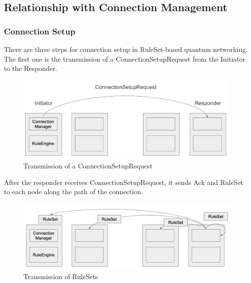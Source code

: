 \subsection{Relationship with Connection Management}
\subsubsection{Connection Setup}

There are three steps for connection setup in RuleSet-based quantum networking. 
The first one is the transmission of a ConnectionSetupRequest from the Initiator to the Responder.
\begin{figure}[H]
  \centerline{\includegraphics[width=\columnwidth]{images/connection_setup_request.png}}
  \caption{Transmission of a ConnectionSetupRequest}
\end{figure}

After the responder receives ConnectionSetupRequest, it sends Ack and RuleSet to each node along the path of the connection.
\begin{figure}[H]
  \centerline{\includegraphics[width=\columnwidth]{images/ack_and_ruleset.png}}
  \caption{Transmission of RuleSets}
\end{figure}

